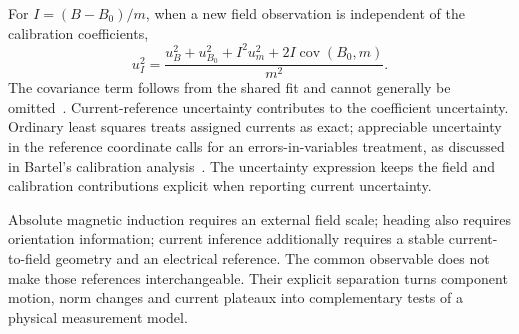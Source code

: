 For $I=(B-B_0)/m$, when a new field observation is independent of the calibration coefficients,
\begin{equation}
 u_I^2=\frac{u_B^2+u_{B_0}^2+I^2u_m^2+
 2I\operatorname{cov}(B_0,m)}{m^2}.
 \label{eq:mag-current-uncertainty}
\end{equation}
The covariance term follows from the shared fit and cannot generally be omitted~\cite{gum}. Current-reference uncertainty contributes to the coefficient uncertainty. Ordinary least squares treats assigned currents as exact; appreciable uncertainty in the reference coordinate calls for an errors-in-variables treatment, as discussed in Bartel's calibration analysis~\cite{bartel2016}. The uncertainty expression keeps the field and calibration contributions explicit when reporting current uncertainty.

Absolute magnetic induction requires an external field scale; heading also requires orientation information; current inference additionally requires a stable current-to-field geometry and an electrical reference. The common observable does not make those references interchangeable. Their explicit separation turns component motion, norm changes and current plateaux into complementary tests of a physical measurement model.
